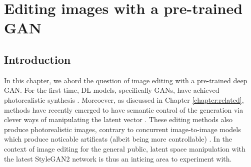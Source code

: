 \chapter{Editing images with a pre-trained GAN}
\label{chapter:magec}

\newcommand{\tableindent}{\,\,\,\,}
\newcommand{\vt}{\mathbf{t}}
\newcommand{\std}{$\pm\,$}
\newcommand{\clf}{\textit{clf}} \newcommand{\gray}[1]{{\color{darkgray}#1}}











\section{Introduction}

In this chapter, we abord the question of image editing with a pre-trained deep \ac{GAN}.
For the first time, \ac{DL} models, specifically \ac{GAN}s, have achieved photorealistic synthesis \citep{karras2018progressive, karra2019stylegan, karra2020stylegan2}.
Moreoever, as discussed in Chapter \ref{chapter:related}, methods have recently emerged to 
have semantic control of the generation via clever ways of manipulating the latent vector \citep{shen2020, abdal2020styleflow, harkonen2020ganspace, tewari2020stylerig, stylespace_analysis, zhuang2021enjoy, editing_style}.
 These editing methods also produce photorealistic images, contrary to concurrent image-to-image models which 
produce noticable artificats (albeit being more controllable) \citep{wang2018pix2pixHD, park2019gaugan}.
 In the context of image editing for the general public, latent space manipulation with the latest 
 StyleGAN2 network \citep{karra2020stylegan2}
is thus an inticing area to experiment with. 

